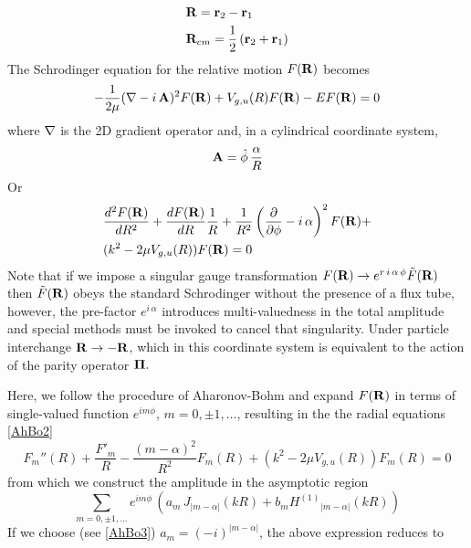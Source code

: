 \begin{equation}
\begin{split}
& {\bf R}= {\bf r}_{2} -{\bf r}_{1}  \\
& {\bf R}_{cm} = \frac{1}{2} \, ( {\bf r}_{2} + {\bf r}_{1} )
\end{split}
\end{equation}
The Schrodinger equation for the relative motion $F({\bf R})$ becomes
\begin{equation}\label{Schr2DAnyon}
 -\frac{1}{2 \mu} ({\bf \nabla} - i \, {\bf A})^2  F({\bf R}) + V_{g,u}(R) F({\bf R}) - E F({\bf R}) =0
\end{equation}
where ${\bf \nabla}$ is  the 2D gradient operator and, in a cylindrical coordinate system,
\begin{equation}
{\bf A} = {\hat {\bf \phi} } \, \frac{\alpha}{R}
\end{equation}
Or
\begin{equation}
\begin{split}
& \frac{d^2 F({\bf R})}{d R^2} + \frac{ d F({\bf R})}{d R} \frac{1}{R} +\frac{1}{R^2} \left (\frac{\partial}{\partial \phi} - i \, \alpha \right )^2 F({\bf R}) +  \\
& (k^2 -2 \mu V_{g,u}(R)) F({\bf R}) = 0
\end{split}
\end{equation}
Note that if we impose a singular gauge transformation 
$ F({\bf R}) \rightarrow e^{r\, i \, \alpha \, \phi} {\tilde F}({\bf R}) $ then 
$ {\tilde F}(\bf R) $ obeys the standard Schrodinger without the presence of a flux tube, however, the pre-factor $e^{i \, \alpha }$ introduces multi-valuedness in the total amplitude and special methods \cite{Berry1980_AB_exact} must be invoked to cancel that singularity. Under
particle interchange $ {\bf R} \rightarrow -{\bf R} $, which in this coordinate system is equivalent to the  action of the parity operator ${\bf  \Pi}. $

Here, we follow the procedure of Aharonov-Bohm and expand $F({\bf R}) $ in terms of
single-valued function $ e^{i m \phi} $, $ m=0,\pm1, \dots $, resulting in the
the radial equations \eqref{AhBo2}
\begin{equation}\label{AhBo2}
F_{m}''(R) + \frac{F'_{m}}{R} - \frac{(m- \alpha)^2}{R^2} F_{m}(R) + (k^2 - 2 \mu V_{g,u}(R)) F_{m}(R) =0
\end{equation}
from which we construct the amplitude in the asymptotic region
\begin{equation}\label{AhBo3}
\sum_{m=0,\pm1,...} e^{i m \phi} \, \left ( a_{m} \, J_{|m-\alpha | }(k R)  + b_{m} {H^{(1)}}_{|m - \alpha |} (k R) \right )
\end{equation}
If we choose (see \eqref{AhBo3}) $ a_{m} = (- i)^{| m - \alpha |}  $,  the above expression reduces to

